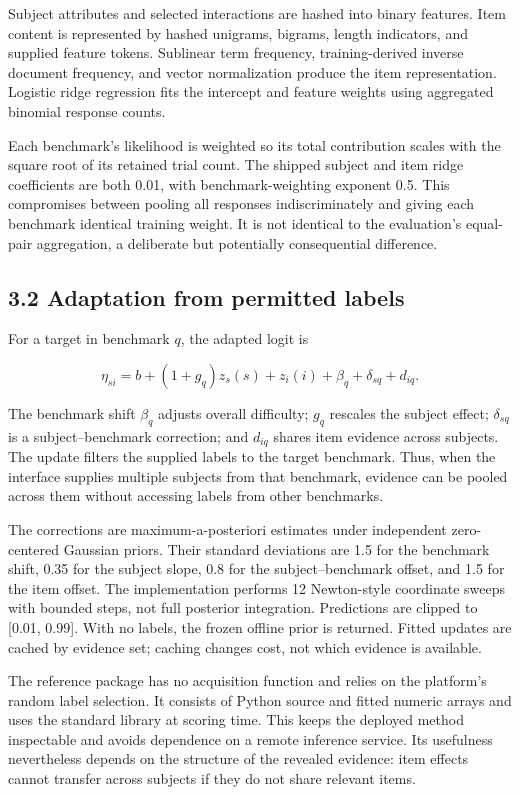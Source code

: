 \documentclass{article}
\begin{document}
Subject attributes and selected interactions are hashed into binary features. Item content is represented by hashed unigrams, bigrams, length indicators, and supplied feature tokens. Sublinear term frequency, training-derived inverse document frequency, and vector normalization produce the item representation. Logistic ridge regression fits the intercept and feature weights using aggregated binomial response counts.

Each benchmark's likelihood is weighted so its total contribution scales with the square root of its retained trial count. The shipped subject and item ridge coefficients are both 0.01, with benchmark-weighting exponent 0.5. This compromises between pooling all responses indiscriminately and giving each benchmark identical training weight. It is not identical to the evaluation's equal-pair aggregation, a deliberate but potentially consequential difference.

\subsection{3.2 Adaptation from permitted labels}\label{adaptation-from-permitted-labels}

For a target in benchmark \(q\), the adapted logit is

\[\eta_{si}=b+(1+g_q)z_s(s)+z_i(i)+\beta_q+\delta_{sq}+d_{iq}.\]

The benchmark shift \(\beta_q\) adjusts overall difficulty; \(g_q\) rescales the subject effect; \(\delta_{sq}\) is a subject--benchmark correction; and \(d_{iq}\) shares item evidence across subjects. The update filters the supplied labels to the target benchmark. Thus, when the interface supplies multiple subjects from that benchmark, evidence can be pooled across them without accessing labels from other benchmarks.

The corrections are maximum-a-posteriori estimates under independent zero-centered Gaussian priors. Their standard deviations are 1.5 for the benchmark shift, 0.35 for the subject slope, 0.8 for the subject--benchmark offset, and 1.5 for the item offset. The implementation performs 12 Newton-style coordinate sweeps with bounded steps, not full posterior integration. Predictions are clipped to {[}0.01, 0.99{]}. With no labels, the frozen offline prior is returned. Fitted updates are cached by evidence set; caching changes cost, not which evidence is available.

The reference package has no acquisition function and relies on the platform's random label selection. It consists of Python source and fitted numeric arrays and uses the standard library at scoring time. This keeps the deployed method inspectable and avoids dependence on a remote inference service. Its usefulness nevertheless depends on the structure of the revealed evidence: item effects cannot transfer across subjects if they do not share relevant items.
\end{document}
